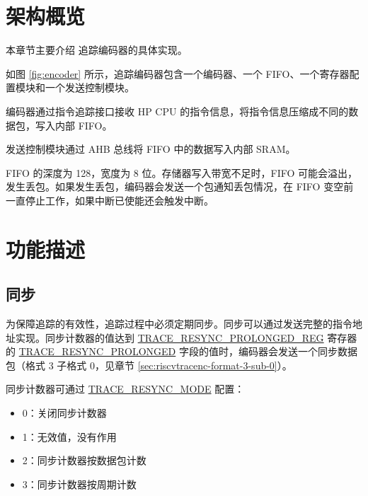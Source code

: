 \documentclass[main\_\_CN.tex]{subfiles}
\begin{document}

\section{架构概览}
\label{sec:riscvtracenc-arch-overview}


本章节主要介绍 \chipname{} 追踪编码器的具体实现。

如图 \ref{fig:encoder} 所示，追踪编码器包含一个编码器、一个 FIFO、一个寄存器配置模块和一个发送控制模块。

编码器通过指令追踪接口接收 HP CPU 的指令信息，将指令信息压缩成不同的数据包，写入内部 FIFO。

发送控制模块通过 AHB 总线将 FIFO 中的数据写入内部 SRAM。

FIFO 的深度为 128，宽度为 8 位。存储器写入带宽不足时，FIFO 可能会溢出，发生丢包。如果发生丢包，编码器会发送一个包通知丢包情况，在 FIFO 变空前一直停止工作，如果中断已使能还会触发中断。



\section{功能描述}
\label{sec:riscvtracenc-func-desc}

\subsection{同步}

为保障追踪的有效性，追踪过程中必须定期同步。同步可以通过发送完整的指令地址实现。同步计数器的值达到 \hyperref[regdesc:TRACERESYNCPROLONGEDREG]{TRACE\_RESYNC\_PROLONGED\_REG} 寄存器的 \hyperref[fielddesc:TRACERESYNCPROLONGED]{TRACE\_RESYNC\_PROLONGED} 字段的值时，编码器会发送一个同步数据包（格式 3 子格式 0，见章节 \ref{sec:riscvtracenc-format-3-sub-0}）。

同步计数器可通过 \hyperref[fielddesc:TRACERESYNCMODE]{TRACE\_RESYNC\_MODE} 配置：
\begin{itemize}
    \item 0：关闭同步计数器
    \item 1：无效值，没有作用
    \item 2：同步计数器按数据包计数
    \item 3：同步计数器按周期计数
\end{itemize}
\end{document}
